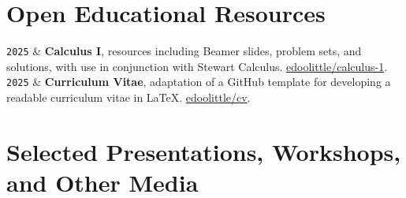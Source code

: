\documentclass[9pt,a4paper]{article}
\newcommand{\Year}[1]{\fontsize{10pt}{0}\selectfont \texttt{#1}}
\newcommand{\GitHub}[1]{\faGithub{} \href{https://github.com/#1}{#1}}
\begin{document}
\section{Open Educational Resources}

\begin{EntriesTableYear}
  \Year{2025} & \textbf{Calculus I}, resources including Beamer
  slides, problem sets, and solutions, with use in conjunction with
  Stewart Calculus.  \GitHub{edoolittle/calculus-1}.
  \\
  \Year{2025} & \textbf{Curriculum Vitae}, adaptation of a GitHub
  template for developing a readable curriculum vitae in \LaTeX.
  \GitHub{edoolittle/cv}.
\end{EntriesTableYear}

\section{Selected Presentations, Workshops, and Other Media}
\end{document}
